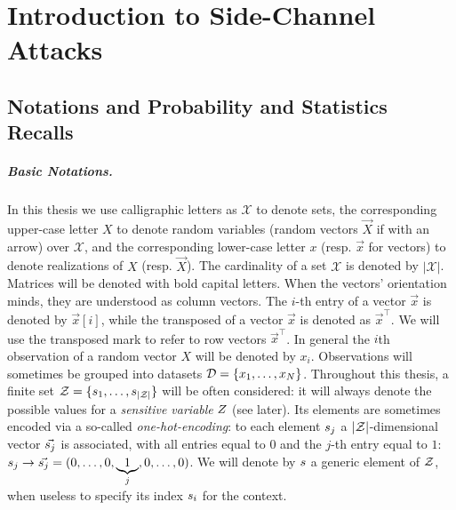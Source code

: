 \chapter{Introduction to Side-Channel Attacks} %

\label{ChapterIntroductionSCA}

\section{Notations and Probability and Statistics Recalls}\label{sec:notations}
\paragraph*{Basic Notations.}
In this thesis we use calligraphic letters as $\mathcal{X}$ to denote
sets, the corresponding upper-case letter $X$ to denote random variables (random
vectors $\vec{X}$ if with an arrow) over $\mathcal{X}$, and the corresponding
lower-case letter $x$ (resp. $\vec{x}$ for vectors) to denote realizations of
$X$ (resp. $\vec{X}$). The cardinality of a set $\mathcal{X}$ is denoted by $\lvert\mathcal{X}\rvert$. Matrices will be denoted with bold capital letters. When the vectors' orientation minds, they are understood as column vectors. The
$i$-th entry of a vector $\vec{x}$ is denoted by $\vec{x}[i]$, while the transposed of a vector $\vec{x}$ is denoted as $\vec{x}^\intercal$. We will use the transposed mark to refer to row vectors $\vec{x}^\intercal$. In general the $i$th observation of a random vector $X$ will be denoted by $x_i$. Observations will sometimes be grouped into datasets $\mathcal{D}=\{x_1,\dots, x_N\}$. Throughout this thesis, a finite set $\mathcal{Z} = \{s_{1}, \dots, s_{\lvert\mathcal{Z}\rvert}\}$ will be often considered: it will always denote the possible values for a \emph{sensitive variable} $Z$ (see later). Its elements are sometimes encoded via a so-called \emph{one-hot-encoding}: to each element $s_{j}$ a $\lvert\mathcal{Z}\rvert$-dimensional vector  $\vec{s_{j}}$ is associated,
with all entries equal to $0$ and the $j$-th entry equal to $1$: $s_{j}
\rightarrow \vec{s_{j}} = (0,\ldots , 0,\underbrace{1}_{j},0,\dots,0)$. We will denote by $s$ a generic element of $\mathcal{Z}$, when useless to specify its index $s_{i}$ for the context.

